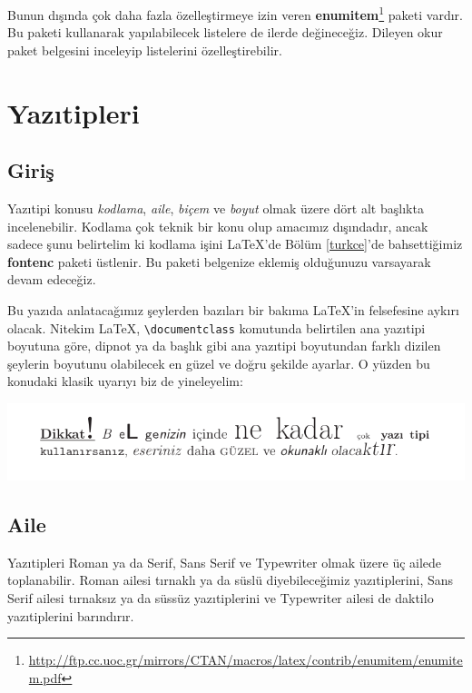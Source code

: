 \documentclass[
  10pt,
]{scrbook}
\renewcommand{\href}[2]{#2\footnote{\url{#1}}}
\theoremstyle{definition}
\theoremstyle{definition}
\theoremstyle{definition}
\theoremstyle{definition}
\theoremstyle{remark}
\begin{document}
Bunun dışında çok daha fazla özelleştirmeye izin veren \href{http://ftp.cc.uoc.gr/mirrors/CTAN/macros/latex/contrib/enumitem/enumitem.pdf}{\textbf{enumitem}} paketi vardır. Bu paketi kullanarak yapılabilecek listelere de ilerde değineceğiz. Dileyen okur paket belgesini inceleyip listelerini özelleştirebilir.

\hypertarget{yazux131tipleri}{%
\section{Yazıtipleri}\label{yazux131tipleri}}

\hypertarget{giriux15f}{%
\subsection{Giriş}\label{giriux15f}}

Yazıtipi konusu \emph{kodlama}, \emph{aile}, \emph{biçem} ve \emph{boyut} olmak üzere dört alt başlıkta incelenebilir. Kodlama çok teknik bir konu olup amacımız dışındadır, ancak sadece şunu belirtelim ki kodlama işini LaTeX'de Bölüm \ref{turkce}'de bahsettiğimiz \textbf{fontenc} paketi üstlenir. Bu paketi belgenize eklemiş olduğunuzu varsayarak devam edeceğiz.

Bu yazıda anlatacağımız şeylerden bazıları bir bakıma LaTeX'in felsefesine aykırı olacak. Nitekim LaTeX, \texttt{\textbackslash{}documentclass} komutunda belirtilen ana yazıtipi boyutuna göre, dipnot ya da başlık gibi ana yazıtipi boyutundan farklı dizilen şeylerin boyutunu olabilecek en güzel ve doğru şekilde ayarlar. O yüzden bu konudaki klasik uyarıyı biz de yineleyelim:

\includegraphics[width=1\textwidth,height=\textheight]{images/uyari.png}

\hypertarget{aile}{%
\subsection{Aile}\label{aile}}

Yazıtipleri Roman ya da Serif, Sans Serif ve Typewriter olmak üzere üç ailede toplanabilir. Roman ailesi tırnaklı ya da süslü diyebileceğimiz yazıtiplerini, Sans Serif ailesi tırnaksız ya da süssüz yazıtiplerini ve Typewriter ailesi de daktilo yazıtiplerini barındırır.
\end{document}
